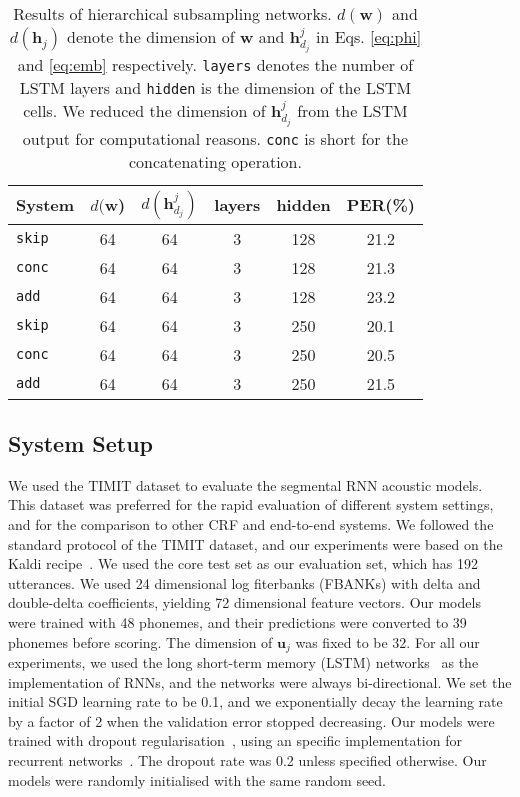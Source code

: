 \documentclass[a4paper]{article}
\begin{document}
 \begin{table}
 \centering \small
\caption{Results of hierarchical subsampling networks. $d(\mathbf{w})$ and $d(\mathbf{h}_j)$ denote the dimension of $\mathbf{w}$ and $\mathbf{h}_{d_j}^j$ in Eqs. \eqref{eq:phi} and \eqref{eq:emb} respectively. {\tt layers} denotes the number of LSTM layers and {\tt hidden} is the dimension of the LSTM  cells. We reduced the dimension of $\mathbf{h}_{d_j}^j$ from the LSTM output for computational reasons. {\tt conc} is short for the concatenating operation. }\vskip 1.5mm

\label{tab:hsrnn}
\begin{tabular}{l|ccccc}
\hline

\hline
System  & $d(\mathbf{w}$) & $d(\mathbf{h}_{d_j}^j)$ & layers & hidden &  PER(\%) \\ \hline
{\tt skip} & 64 & 64 & 3 & 128 & 21.2 \\
{\tt conc} & 64 & 64 & 3 & 128  & 21.3 \\
{\tt add}  & 64 & 64 & 3 & 128  & 23.2 \\ \hline
{\tt skip} & 64 & 64 & 3 & 250 & 20.1 \\
{\tt conc} & 64 & 64 & 3 & 250 & 20.5 \\ 
{\tt add} & 64 & 64 & 3 & 250 & 21.5  \\

\hline

\hline
\end{tabular}
\vskip-5mm
\end{table}

\subsection{System Setup}

We used the TIMIT dataset to evaluate the segmental RNN acoustic models. This dataset was preferred for the rapid evaluation of different system settings, and for the comparison to other CRF and end-to-end systems. We followed the standard protocol of the TIMIT dataset, and our experiments were based on the Kaldi recipe~\cite{povey2011kaldi}. We used the core test set as our evaluation set, which has 192 utterances. We used 24 dimensional log fiterbanks (FBANKs) with delta and double-delta coefficients, yielding 72 dimensional feature vectors. Our models were trained with 48 phonemes, and their predictions were converted to 39 phonemes before scoring. The dimension of $\mathbf{u}_j$ was fixed to be 32. For all our experiments, we used the long short-term memory (LSTM) networks~\cite{hochreiter1997long} as the implementation of RNNs, and the networks were always bi-directional. We set the initial SGD learning rate to be 0.1, and we exponentially decay the learning rate by a factor of 2 when the validation error stopped decreasing. Our models were trained with dropout regularisation~\cite{srivastava2014dropout}, using an specific implementation for recurrent networks~\cite{zaremba2014recurrent}. The dropout rate was 0.2 unless specified otherwise. Our models were randomly initialised with the same random seed.
\end{document}

